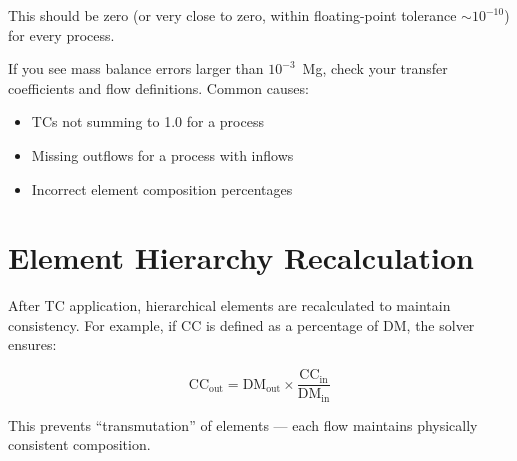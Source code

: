 This should be zero (or very close to zero, within floating-point tolerance $\sim 10^{-10}$) for every process.

\begin{warnbox}
If you see mass balance errors larger than $10^{-3}$~Mg, check your transfer coefficients and flow definitions. Common causes:
\begin{itemize}
  \item TCs not summing to 1.0 for a process
  \item Missing outflows for a process with inflows
  \item Incorrect element composition percentages
\end{itemize}
\end{warnbox}

\section{Element Hierarchy Recalculation}

After TC application, hierarchical elements are recalculated to maintain consistency. For example, if CC is defined as a percentage of DM, the solver ensures:

\begin{equation}
  \text{CC}_{\text{out}} = \text{DM}_{\text{out}} \times \frac{\text{CC}_{\text{in}}}{\text{DM}_{\text{in}}}
\end{equation}

This prevents ``transmutation'' of elements --- each flow maintains physically consistent composition.
